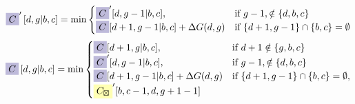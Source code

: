 \documentclass{article}
\begin{document}
$$ \colorbox{c2}{$C$}' \left[d,g | b,c \right] =  \min\begin{cases}\colorbox{c2}{$C$}'[ d , g-1|b,c ], &\text{if } g-1 ,\notin\{ d , b,c \} \\\colorbox{c2}{$C$}[ d+1 , g-1|b,c ]+\Delta G(d,g) &\text{if } \{ d+1 , g-1 \}\cap \{ b,c \}=\emptyset\end{cases}$$
$$ \colorbox{c2}{$C$} \left[d,g | b,c \right] =  \min\begin{cases}\colorbox{c2}{$C$}[ d+1 , g|b,c ], &\text{if } d+1 \notin\{ g , b,c \} \\\colorbox{c2}{$C$}'[ d , g-1|b,c ], &\text{if } g-1 ,\notin\{ d , b,c \} \\\colorbox{c2}{$C$}[ d+1 , g-1|b,c ]+\Delta G(d,g) &\text{if } \{ d+1 , g-1 \}\cap \{ b,c \}=\emptyset,\\\colorbox{c1}{$C_{\boxtimes}$}'[b,c-1,d,g+1-1]\end{cases}$$
\end{document}
